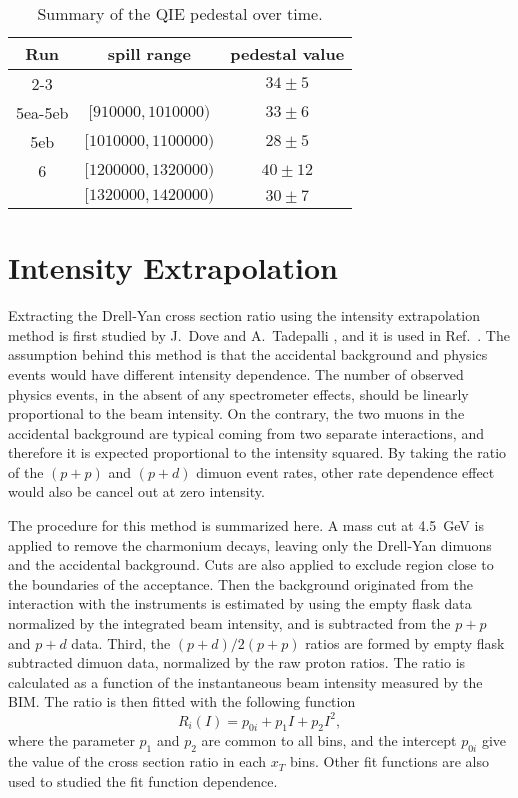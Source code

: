 \documentclass[../main.tex]{subfiles}
\begin{document}
\begin{table}[h!]
	\centering
	\caption{Summary of the QIE pedestal over time\cite{kenichi-9289}.}
	\label{tabel:pedestal}
	\begin{tabular}{|c|c|c|}
		\hline
		Run     & spill range                     & pedestal value \\ \hline
		2-3     &                                 & $34\pm5$       \\ \hline
		5ea-5eb & $[\num{910000},\num{1010000})$  & $33\pm 6$      \\ \hline
		5eb     & $[\num{1010000},\num{1100000})$ & $28\pm 5$      \\ \hline
		6       & $[\num{1200000},\num{1320000})$ & $40\pm 12$     \\ \cline{2-3}
		        & $[\num{1320000},\num{1420000})$ & $30\pm 7$      \\ \hline
	\end{tabular}
\end{table}

\section{Intensity Extrapolation}
\label{sec:extrapolation}
Extracting the Drell-Yan cross section ratio using the intensity extrapolation method
is first studied by J.~Dove \cite{dove2020} and A.~Tadepalli \cite{tadepalli2019},
and it is used in Ref.~\cite{dove2021}.
The assumption behind this method is that the accidental background and physics events
would have different intensity dependence. The number of observed physics
events, in the absent of any spectrometer effects, should be linearly proportional to the beam
intensity. On the contrary, the two muons in the accidental background are typical coming from
two separate interactions, and therefore it is expected proportional to the intensity squared.
By taking the ratio of the $(p+p)$ and $(p+d)$ dimuon event rates,
other rate dependence effect would also be cancel out at zero intensity.

The procedure for this method is summarized here. A mass cut at \SI{4.5}{\GeV} is applied to
remove the charmonium decays, leaving only the Drell-Yan dimuons and the accidental background.
Cuts are also applied to exclude region close to the boundaries of the acceptance.
Then the background originated from the interaction with the instruments is estimated by using
the empty flask data normalized by the integrated beam intensity, and is subtracted from the
$p+p$ and $p+d$ data. Third, the $(p+d)/2(p+p)$ ratios are formed by empty flask subtracted
dimuon data, normalized by the raw proton ratios. The ratio is calculated as a function of the
instantaneous beam intensity measured by the BIM. The ratio is then fitted with the following function
\begin{equation}
	R_i \left(I\right) = p_{0i} + p_1 I + p_2 I^2,
	\label{eq:common_pol2}
\end{equation}
where the parameter $p_1$ and $p_2$ are common to all bins, and the intercept $p_{0i}$ give
the value of the cross section ratio in each $x_T$ bins. Other fit functions are also used
to studied the fit function dependence.
\end{document}
